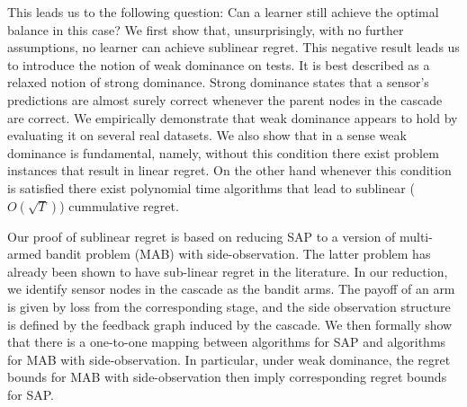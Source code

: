 
This leads us to the following question: Can a learner still achieve the optimal balance in this case?  We first show that, unsurprisingly, with no further assumptions, no learner can achieve sublinear regret. 
This negative result leads us to introduce the notion of weak dominance on tests. It is best described as a relaxed notion of strong dominance. Strong dominance states that a sensor's predictions are almost surely correct whenever the parent nodes in the cascade are correct.  We empirically demonstrate that weak dominance appears to hold by evaluating it on several real datasets. We also show that in a sense weak dominance is fundamental, namely, without this condition there exist problem instances that result in linear regret. On the other hand whenever this condition is satisfied there exist polynomial time algorithms that lead to sublinear ($O(\sqrt{T})$) cummulative regret. 

Our proof of sublinear regret is based on reducing SAP to a version of multi-armed bandit problem (MAB) with side-observation. The latter problem has already been shown to have sub-linear regret in the literature. In our reduction, we identify sensor nodes in the cascade as the bandit arms. %
The payoff of an arm is given by loss from the corresponding stage, and the side observation structure is defined by the feedback graph induced by the cascade. We then formally show that there is a one-to-one mapping between algorithms for SAP and algorithms for MAB with side-observation. In particular, under weak dominance, the regret bounds for MAB with side-observation then imply corresponding regret bounds for SAP. 


